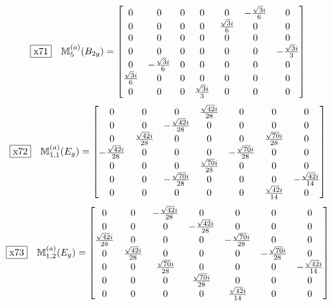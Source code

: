 \documentclass[fleqn,10pt,landscape]{jsarticle}
\begin{document}
\begin{dmath*}
\fbox{x71}\quad \mathbb{M}_{5}^{(a)}(B_{2g})=\begin{bmatrix} 0 & 0 & 0 & 0 & 0 & - \frac{\sqrt{3} i}{6} & 0 \\ 0 & 0 & 0 & 0 & \frac{\sqrt{3} i}{6} & 0 & 0 \\ 0 & 0 & 0 & 0 & 0 & 0 & 0 \\ 0 & 0 & 0 & 0 & 0 & 0 & - \frac{\sqrt{3} i}{3} \\ 0 & - \frac{\sqrt{3} i}{6} & 0 & 0 & 0 & 0 & 0 \\ \frac{\sqrt{3} i}{6} & 0 & 0 & 0 & 0 & 0 & 0 \\ 0 & 0 & 0 & \frac{\sqrt{3} i}{3} & 0 & 0 & 0 \end{bmatrix}
\end{dmath*}
\begin{dmath*}
\fbox{x72}\quad \mathbb{M}_{1,1}^{(a)}(E_{g})=\begin{bmatrix} 0 & 0 & 0 & \frac{\sqrt{42} i}{28} & 0 & 0 & 0 \\ 0 & 0 & - \frac{\sqrt{42} i}{28} & 0 & 0 & 0 & 0 \\ 0 & \frac{\sqrt{42} i}{28} & 0 & 0 & 0 & \frac{\sqrt{70} i}{28} & 0 \\ - \frac{\sqrt{42} i}{28} & 0 & 0 & 0 & - \frac{\sqrt{70} i}{28} & 0 & 0 \\ 0 & 0 & 0 & \frac{\sqrt{70} i}{28} & 0 & 0 & 0 \\ 0 & 0 & - \frac{\sqrt{70} i}{28} & 0 & 0 & 0 & - \frac{\sqrt{42} i}{14} \\ 0 & 0 & 0 & 0 & 0 & \frac{\sqrt{42} i}{14} & 0 \end{bmatrix}
\end{dmath*}
\begin{dmath*}
\fbox{x73}\quad \mathbb{M}_{1,2}^{(a)}(E_{g})=\begin{bmatrix} 0 & 0 & - \frac{\sqrt{42} i}{28} & 0 & 0 & 0 & 0 \\ 0 & 0 & 0 & - \frac{\sqrt{42} i}{28} & 0 & 0 & 0 \\ \frac{\sqrt{42} i}{28} & 0 & 0 & 0 & - \frac{\sqrt{70} i}{28} & 0 & 0 \\ 0 & \frac{\sqrt{42} i}{28} & 0 & 0 & 0 & - \frac{\sqrt{70} i}{28} & 0 \\ 0 & 0 & \frac{\sqrt{70} i}{28} & 0 & 0 & 0 & - \frac{\sqrt{42} i}{14} \\ 0 & 0 & 0 & \frac{\sqrt{70} i}{28} & 0 & 0 & 0 \\ 0 & 0 & 0 & 0 & \frac{\sqrt{42} i}{14} & 0 & 0 \end{bmatrix}
\end{dmath*}
\end{document}
